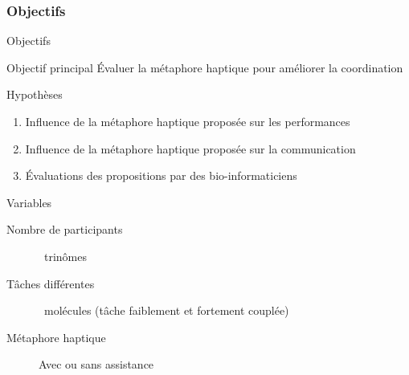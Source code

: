 \documentclass[english,french,dvips,10pt]{mybeamer}
\begin{document}
	\subsubsection{Objectifs}
	\begin{myframe}{Objectifs}
		\begin{myblock}{Objectif principal}
			Évaluer la métaphore haptique pour améliorer la coordination
		\end{myblock}
		\begin{myplusblock}{Hypothèses}
			\begin{enumerate}
				\item Influence de la métaphore haptique proposée sur les performances
				\item Influence de la métaphore haptique proposée sur la communication
				\item Évaluations des propositions par des bio-informaticiens
			\end{enumerate}
		\end{myplusblock}
		\begin{myblock}{Variables}
			\begin{description}
				\item[Nombre de participants] ~trinômes
				\item[Tâches différentes] ~molécules (tâche faiblement et fortement couplée)
				\item[Métaphore haptique] Avec ou sans assistance
			\end{description}
		\end{myblock}
	\end{myframe}
\end{document}
